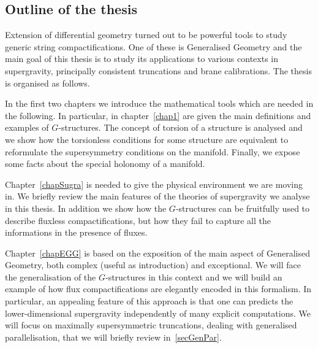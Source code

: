 \documentclass[draft]{phd}
\begin{document}
%		


\subsection*{Outline of the thesis}
		
			Extension of differential geometry turned out to be powerful tools to study generic string compactifications. 
			One of these is Generalised Geometry and the main goal of this thesis is to study its applications to various contexts in supergravity, principally consistent truncations and brane calibrations.
			The thesis is organised as follows.
			
			In the first two chapters we introduce the mathematical tools which are needed in the following.
			In particular, in chapter~\ref{chap1} are given the main definitions and examples of $G$-structures. 
			The concept of torsion of a structure is analysed and we show how the torsionless conditions for some structure are equivalent to reformulate the supersymmetry conditions on the manifold.
			Finally, we expose some facts about the special holonomy of a manifold.
			
			Chapter~\ref{chapSugra} is needed to give the physical environment we are moving in. 
			We briefly review the main features of the theories of supergravity we analyse in this thesis. 
			In addition we show how the $G$-structures can be fruitfully used to describe fluxless compactifications, but how they fail to capture all the informations in the presence of fluxes.
			
			Chapter~\ref{chapEGG} is based on the exposition of the main aspect of Generalised Geometry, both complex (useful as introduction) and exceptional.
			We will face the generalisation of the $G$-structures in this context and we will build an example of how flux compactifications are elegantly encoded in this formalism.
			In particular, an appealing feature of this approach is that one can predicts the lower-dimensional supergravity independently of many explicit computations.
			We will focus on maximally supersymmetric truncations, dealing with generalised parallelisation, that we will briefly review in~\ref{secGenPar}.
			
\end{document}
